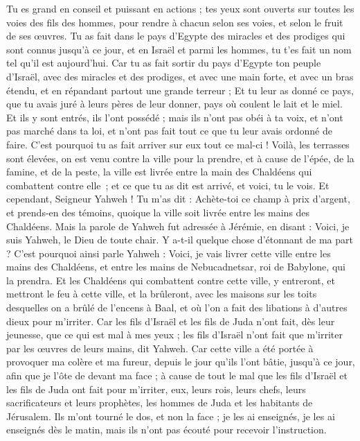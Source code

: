 \begin{multicols}{2}
Tu es grand en conseil et puissant en actions ; tes yeux sont ouverts sur toutes les voies des fils des hommes, pour rendre à chacun selon ses voies, et selon le fruit de ses œuvres.
Tu as fait dans le pays d'Egypte des miracles et des prodiges qui sont connus jusqu'à ce jour, et en Israël et parmi les hommes, tu t'es fait un nom tel qu'il est aujourd'hui.
Car tu as fait sortir du pays d'Egypte ton peuple d'Israël, avec des miracles et des prodiges, et avec une main forte, et avec un bras étendu, et en répandant partout une grande terreur ;
Et tu leur as donné ce pays, que tu avais juré à leurs pères de leur donner, pays où coulent le lait et le miel.
Et ils y sont entrés, ils l'ont possédé ; mais ils n'ont pas obéi à ta voix, et n'ont pas marché dans ta loi, et n'ont pas fait tout ce que tu leur avais ordonné de faire. C'est pourquoi tu as fait arriver sur eux tout ce mal-ci !
Voilà, les terrasses sont élevées, on est venu contre la ville pour la prendre, et à cause de l’épée, de la famine, et de la peste, la ville est livrée entre la main des Chaldéens qui combattent contre elle ; et ce que tu as dit est arrivé, et voici, tu le vois.
Et cependant, Seigneur Yahweh ! Tu m'as dit : Achète-toi ce champ à prix d'argent, et prends-en des témoins, quoique la ville soit livrée entre les mains des Chaldéens.
Mais la parole de Yahweh fut adressée à Jérémie, en disant :
Voici, je suis Yahweh, le Dieu de toute chair. Y a-t-il quelque chose d'étonnant de ma part ?
C'est pourquoi ainsi parle Yahweh : Voici, je vais livrer cette ville entre les mains des Chaldéens, et entre les mains de Nebucadnetsar, roi de Babylone, qui la prendra.
Et les Chaldéens qui combattent contre cette ville, y entreront, et mettront le feu à cette ville, et la brûleront, avec les maisons sur les toits desquelles on a brûlé de l'encens à Baal, et où l'on a fait des libations à d'autres dieux pour m'irriter.
Car les fils d'Israël et les fils de Juda n'ont fait, dès leur jeunesse, que ce qui est mal à mes yeux ; les fils d'Israël n'ont fait que m'irriter par les œuvres de leurs mains, dit Yahweh.
Car cette ville a été portée à provoquer ma colère et ma fureur, depuis le jour qu'ils l'ont bâtie, jusqu'à ce jour, afin que je l'ôte de devant ma face ;
à cause de tout le mal que les fils d'Israël et les fils de Juda ont fait pour m'irriter, eux, leurs rois, leurs chefs, leurs sacrificateurs et leurs prophètes, les hommes de Juda et les habitants de Jérusalem.
Ils m'ont tourné le dos, et non la face ; je les ai enseignés, je les ai enseignés dès le matin, mais ils n'ont pas écouté pour recevoir l'instruction.

\end{multicols}
